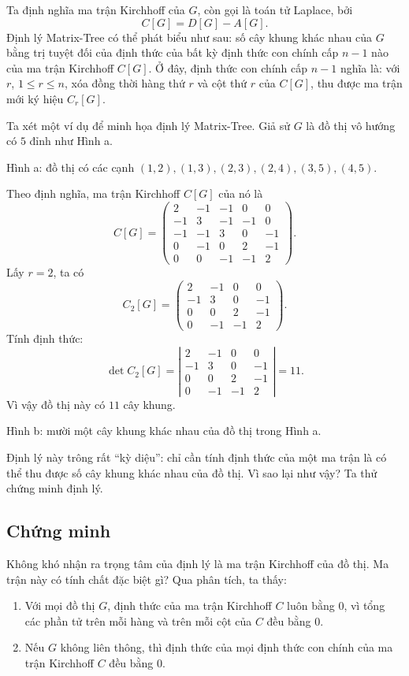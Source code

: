 \documentclass[11pt]{article}
\newcommand{\mat}[1]{\begin{pmatrix}#1\end{pmatrix}}
\begin{document}
Ta định nghĩa ma trận Kirchhoff của \(G\), còn gọi là toán tử Laplace, bởi
\[
  C[G]=D[G]-A[G].
\]
Định lý Matrix-Tree có thể phát biểu như sau: số cây khung khác nhau của
\(G\) bằng trị tuyệt đối của định thức của bất kỳ định thức con chính cấp
\(n-1\) nào của ma trận Kirchhoff \(C[G]\). Ở đây, định thức con chính cấp
\(n-1\) nghĩa là: với \(r\), \(1\le r\le n\), xóa đồng thời hàng thứ \(r\) và
cột thứ \(r\) của \(C[G]\), thu được ma trận mới ký hiệu \(C_r[G]\).

Ta xét một ví dụ để minh họa định lý Matrix-Tree. Giả sử \(G\) là đồ thị vô
hướng có \(5\) đỉnh như Hình a.

\begin{center}
  \small Hình a: đồ thị có các cạnh
  \((1,2),(1,3),(2,3),(2,4),(3,5),(4,5)\).
\end{center}

Theo định nghĩa, ma trận Kirchhoff \(C[G]\) của nó là
\[
  C[G]=
  \mat{
   2&-1&-1& 0& 0\\
  -1& 3&-1&-1& 0\\
  -1&-1& 3& 0&-1\\
   0&-1& 0& 2&-1\\
   0& 0&-1&-1& 2
  }.
\]
Lấy \(r=2\), ta có
\[
  C_2[G]=
  \mat{
   2&-1& 0& 0\\
  -1& 3& 0&-1\\
   0& 0& 2&-1\\
   0&-1&-1& 2
  }.
\]
Tính định thức:
\[
  \det C_2[G]
  =
  \left|\begin{matrix}
   2&-1& 0& 0\\
  -1& 3& 0&-1\\
   0& 0& 2&-1\\
   0&-1&-1& 2
  \end{matrix}\right|
  =11.
\]
Vì vậy đồ thị này có \(11\) cây khung.

\begin{center}
  \small Hình b: mười một cây khung khác nhau của đồ thị trong Hình a.
\end{center}

Định lý này trông rất ``kỳ diệu'': chỉ cần tính định thức của một ma trận là
có thể thu được số cây khung khác nhau của đồ thị. Vì sao lại như vậy? Ta thử
chứng minh định lý.

\subsection{Chứng minh}

Không khó nhận ra trọng tâm của định lý là ma trận Kirchhoff của đồ thị. Ma
trận này có tính chất đặc biệt gì? Qua phân tích, ta thấy:
\begin{enumerate}
  \item Với mọi đồ thị \(G\), định thức của ma trận Kirchhoff \(C\) luôn bằng
  \(0\), vì tổng các phần tử trên mỗi hàng và trên mỗi cột của \(C\) đều bằng
  \(0\).

  \item Nếu \(G\) không liên thông, thì định thức của mọi định thức con chính
  của ma trận Kirchhoff \(C\) đều bằng \(0\).
\end{enumerate}
\end{document}
